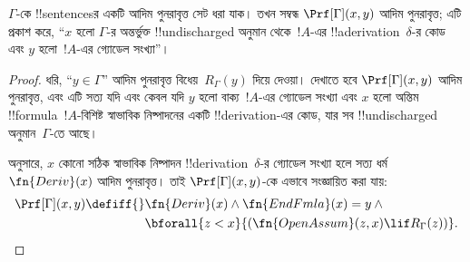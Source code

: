 \documentclass[../../../include/open-logic-section]{subfiles}
\begin{document}
\begin{prop}
  $\Gamma$-কে !!{sentence}sর একটি আদিম পুনরাবৃত্ত সেট ধরা যাক। তখন
  সম্বন্ধ $\Prf[\Gamma](x, y)$ আদিম পুনরাবৃত্ত; এটি প্রকাশ করে, ``$x$ হলো
  $\Gamma$-র অন্তর্ভুক্ত !!{undischarged} অনুমান থেকে~$!A$-এর
  !!a{derivation}~$\delta$-র কোড এবং $y$ হলো~$!A$-এর গ্যোডেল সংখ্যা''।
\end{prop}

\begin{proof}
  ধরি, ``$y \in \Gamma$'' আদিম পুনরাবৃত্ত বিধেয়~$R_\Gamma(y)$ দিয়ে দেওয়া।
  দেখাতে হবে $\Prf[\Gamma](x, y)$ আদিম পুনরাবৃত্ত, এবং এটি সত্য যদি এবং কেবল
  যদি $y$ হলো বাক্য~$!A$-এর গ্যোডেল
  সংখ্যা এবং $x$ হলো অন্তিম !!{formula}~$!A$-বিশিষ্ট স্বাভাবিক নিষ্পাদনের
  একটি !!{derivation}-এর কোড, যার সব !!{undischarged} অনুমান~$\Gamma$-তে আছে।

   অনুসারে, $x$ কোনো সঠিক স্বাভাবিক নিষ্পাদন
  !!{derivation}~$\delta$-র গ্যোডেল সংখ্যা হলে সত্য ধর্ম $\fn{Deriv}(x)$ আদিম
  পুনরাবৃত্ত। তাই $\Prf[\Gamma](x, y)$-কে এভাবে সংজ্ঞায়িত করা যায়:
  \begin{align*}
    \Prf[\Gamma](x, y) \defiff {}
    & \fn{Deriv}(x) \land \fn{EndFmla}(x) = y \land {} \\
    & \bforall{z < x}{(\fn{OpenAssum}(z, x) \lif R_\Gamma(z))}.
  \end{align*}
\end{proof}
\end{document}
